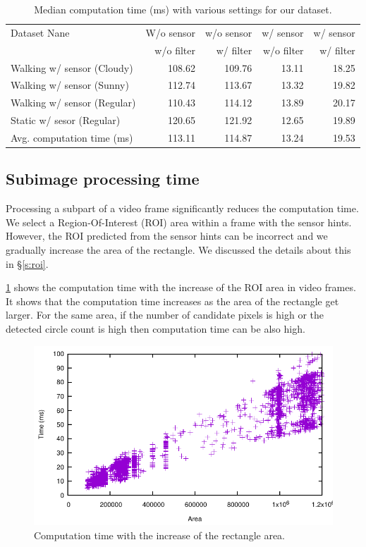 \begin{table}[!ht]
  \centering
  \caption{Median computation time (ms) with various settings for our dataset.}
  \label{t:dataset_time}
  \begin{tabular}{  l r r r r}
    \rowcolor{gray!50}
    Dataset Nane & W/o sensor & w/o sensor & w/ sensor  & w/ sensor \\
    \rowcolor{gray!50}
    & w/o filter & w/ filter & w/o filter & w/ filter\\
    \hline
    Walking w/ sensor (Cloudy) & 108.62 & 109.76 & 13.11 & 18.25 \\
    Walking w/ sensor (Sunny) & 112.74 & 113.67 & 13.32 & 19.82 \\
    Walking w/ sensor (Regular) & 110.43 & 114.12 & 13.89 & 20.17 \\
    Static w/ sesor (Regular) & 120.65 & 121.92 & 12.65 & 19.89\\
    \hline
    Avg. computation time (ms) & 113.11 & 114.87 & 13.24 & 19.53\\
    
  \end{tabular}
\end{table}

\subsection{Subimage processing time}
Processing a subpart of a video frame significantly reduces the computation time. 
We select a Region-Of-Interest (ROI) area within a frame with the sensor hints.
However, the ROI predicted from the sensor hints can be incorrect and we gradually increase the area of the rectangle.
We discussed the details about this in \S\ref{s:roi}.


\ref{f:recarea} shows the computation time with the increase of the ROI area in video frames.
It shows that the computation time increases as the area of the rectangle get larger.
For the same area, if the number of candidate pixels is high or the detected circle count is high then computation time can be also high.

\begin{figure}[h!]
\centering
\includegraphics[width=5.2in]{plots/cloudy_recarea.pdf}
\caption{Computation time with the increase of the rectangle area.}
\label{f:recarea}
\end{figure}



